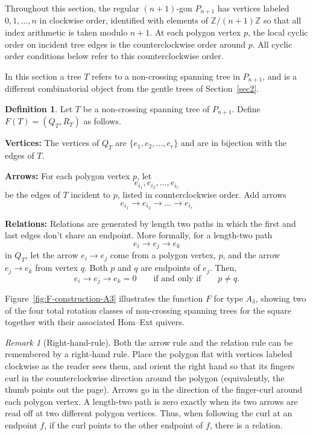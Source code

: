 \documentclass[12pt]{amsart}
\theoremstyle{definition}
\newtheorem{defn}[thm]{Definition}
\theoremstyle{remark}
\newtheorem{rem}[thm]{Remark}
\numberwithin{equation}{section}
\begin{document}
Throughout this section, the regular \((n+1)\)-gon \(P_{n+1}\) has vertices labeled \(0, 1, \dots, n\) in clockwise order, identified with elements of \(\mathbb{Z}/(n+1)\mathbb{Z}\) so that all index arithmetic is taken modulo \(n+1\). At each polygon vertex \(p\), the local cyclic order on incident tree edges is the counterclockwise order around \(p\). All cyclic order conditions below refer to this counterclockwise order.

In this section a tree \(T\) refers to a non-crossing spanning tree in $P_{n+1}$, and is a different combinatorial object from the gentle trees of Section~\ref{sec2}.

\begin{defn}
Let \(T\) be a non-crossing spanning tree of \(P_{n+1}\). Define \(F(T)=(Q_T,R_T)\) as follows. 

\textbf{Vertices:} The vertices of \(Q_T\) are $\{e_1, e_2, \dots, e_r\}$ and are in bijection with the edges of \(T\).

\textbf{Arrows:} For each polygon vertex \(p\), let
\[
e_{i_1},e_{i_2},\dots,e_{i_r}
\]
be the edges of \(T\) incident to \(p\), listed in counterclockwise order. Add arrows
\[
e_{i_1} \to e_{i_2} \to \dots \to e_{i_r}
\]

\textbf{Relations:} Relations are generated by length two paths in which the first and last edges don't share an endpoint. More formally, for a length-two path
\[
e_i\to e_j\to e_k
\]
in \(Q_T\), let the arrow \(e_i \to e_j\) come from a polygon vertex, \(p\), and the arrow \(e_j \to e_k\) from vertex \(q\). Both \(p\) and \(q\) are endpoints of \(e_j\). Then,
\[
e_i \to e_j \to e_k=0 \qquad \text{if and only if} \qquad p \neq q.
\]
\label{def: F}
\end{defn}

Figure~\ref{fig:F-construction-A3} illustrates the function \(F\) for type \(A_3\), showing two of the four total rotation classes of non-crossing spanning trees for the square together with their associated Hom--Ext quivers.

\begin{rem}[Right-hand-rule]
Both the arrow rule and the relation rule can be remembered by a right-hand rule. Place the polygon flat with vertices labeled clockwise as the reader sees them, and orient the right hand so that its fingers curl in the counterclockwise direction around the polygon (equivalently, the thumb points out the page). Arrows go in the direction of the finger-curl around each polygon vertex. A length-two path is zero exactly when its two arrows are read off at two different polygon vertices. Thus, when following the curl at an endpoint \(f\), if the curl points to the other endpoint of \(f\), there is a relation.
\label{rem: rhr}
\end{rem}
\end{document}
